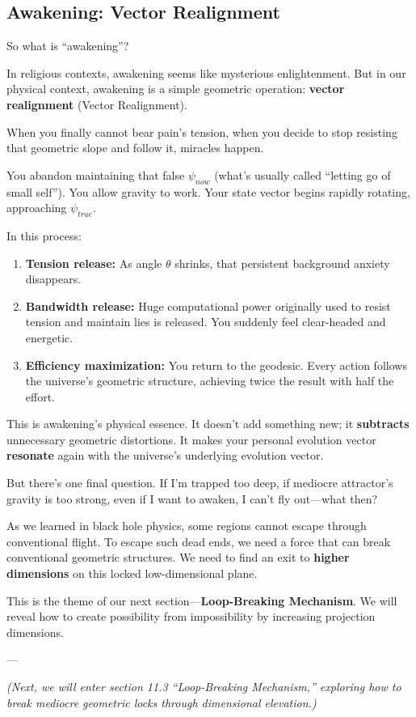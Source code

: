 \subsection{Awakening: Vector Realignment}

So what is ``awakening''?

In religious contexts, awakening seems like mysterious enlightenment. But in our physical context, awakening is a simple geometric operation: \textbf{vector realignment} (Vector Realignment).

When you finally cannot bear pain's tension, when you decide to stop resisting that geometric slope and follow it, miracles happen.

You abandon maintaining that false $\psi_{now}$ (what's usually called ``letting go of small self''). You allow gravity to work. Your state vector begins rapidly rotating, approaching $\psi_{true}$.

In this process:

\begin{enumerate}
\item \textbf{Tension release:} As angle $\theta$ shrinks, that persistent background anxiety disappears.

\item \textbf{Bandwidth release:} Huge computational power originally used to resist tension and maintain lies is released. You suddenly feel clear-headed and energetic.

\item \textbf{Efficiency maximization:} You return to the geodesic. Every action follows the universe's geometric structure, achieving twice the result with half the effort.
\end{enumerate}

This is awakening's physical essence. It doesn't add something new; it \textbf{subtracts} unnecessary geometric distortions. It makes your personal evolution vector \textbf{resonate} again with the universe's underlying evolution vector.

But there's one final question. If I'm trapped too deep, if mediocre attractor's gravity is too strong, even if I want to awaken, I can't fly out---what then?

As we learned in black hole physics, some regions cannot escape through conventional flight. To escape such dead ends, we need a force that can break conventional geometric structures. We need to find an exit to \textbf{higher dimensions} on this locked low-dimensional plane.

This is the theme of our next section---\textbf{Loop-Breaking Mechanism}. We will reveal how to create possibility from impossibility by increasing projection dimensions.

---

\textit{(Next, we will enter section 11.3 ``Loop-Breaking Mechanism,'' exploring how to break mediocre geometric locks through dimensional elevation.)}

